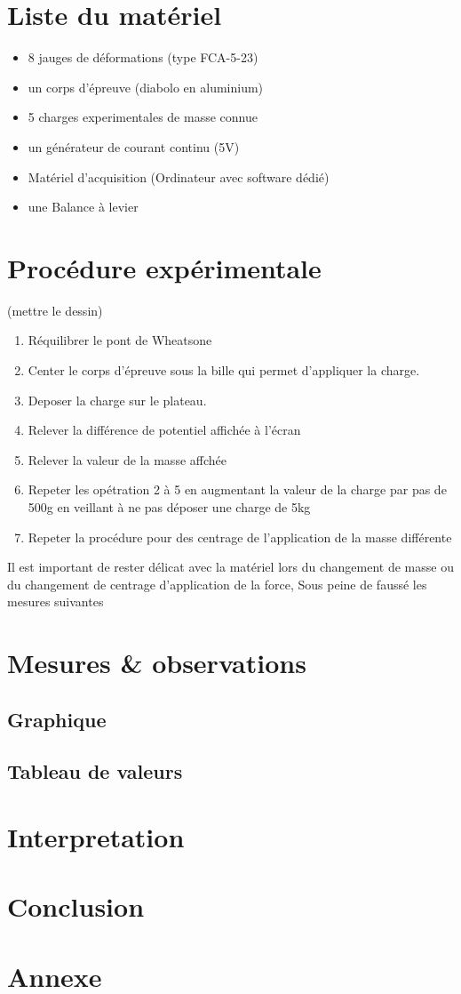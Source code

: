 \documentclass[11pt,a4paper]{report}
\begin{document}
\chapter{Liste du matériel}
\begin{itemize}
\item 8 jauges de déformations (type FCA-5-23)
\item un corps d'épreuve (diabolo en aluminium)
\item 5 charges experimentales de masse connue
\item un générateur de courant continu (5V)
\item Matériel d'acquisition (Ordinateur avec software dédié)
\item une Balance à levier
\end{itemize}	

\chapter{Procédure expérimentale}

(mettre le dessin)

\begin{enumerate}
\item Réquilibrer le pont de Wheatsone
\item Center le corps d'épreuve sous la bille qui permet d'appliquer la charge.
\item Deposer la charge sur le plateau.
\item Relever la différence de potentiel affichée à l'écran
\item Relever la valeur de la masse affchée
\item Repeter les opétration 2 à 5 en augmentant la valeur de la charge par pas de 500g en veillant à ne pas déposer une charge de 5kg
\item Repeter la procédure pour des centrage de l'application de la masse différente
\end{enumerate}
Il est important de rester délicat avec la matériel lors du changement de masse ou du changement de centrage d'application de la force, Sous peine de faussé les mesures suivantes
\chapter{Mesures \& observations}
\section{Graphique}
\section{Tableau de valeurs}

	
\chapter{Interpretation}	
\chapter{Conclusion}	
\chapter{Annexe}	
\end{document}
